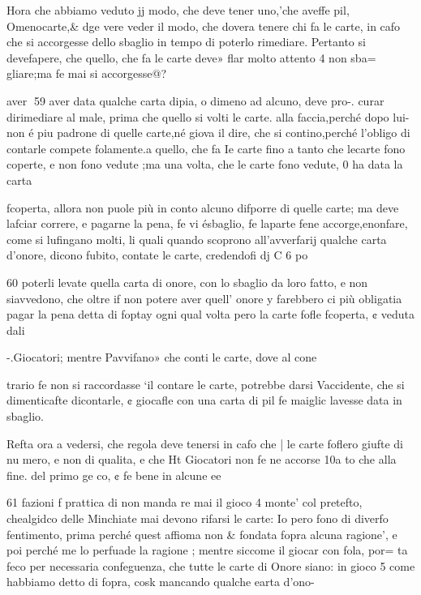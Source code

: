 \documentclass[12pt,a6paper]{article}
\begin{document}
Hora che abbiamo veduto jj
modo, che deve tener uno,'che
aveffe pil, Omenocarte,& dge
vere veder il modo, che dovera tenere chi fa le carte, in cafo
che si accorgesse dello sbaglio
in tempo di poterlo rimediare.
Pertanto si devefapere, che
quello, che fa le carte deve»
flar molto attento 4 non sba=
gliare;ma fe mai si accorgesse@?

aver
59
aver data qualche carta dipia,
o dimeno ad alcuno, deve pro-.
curar dirimediare al male, prima che quello si volti le carte.
alla faccia,perché dopo lui-non
é piu padrone di quelle carte,né
giova il dire, che si contino,perché l’obligo di contarle compete folamente.a quello, che fa Ie
carte fino a tanto che lecarte
fono coperte, e non fono vedute ;ma una volta, che le carte
fono vedute, 0 ha data la carta

fcoperta, allora non puole più 
in conto alcuno difporre di
quelle carte; ma deve lafciar
correre, e pagarne la pena, fe vi
ésbaglio, fe laparte fene accorge,enonfare, come si lufingano molti, li quali quando
scoprono all’avverfarij qualche
carta d’onore, dicono fubito,
contate le carte, credendofi dj
C 6 po 

 

 

  

60
poterli levate quella carta di
onore, con lo sbaglio da loro
fatto, e non siavvedono, che
oltre if non potere aver quell’
onore y farebbero ci più obligatia pagar la pena detta di foptay
ogni qual volta pero la carte
fofle fcoperta, ¢ veduta dali

-.Giocatori; mentre Pavvifano»
che conti le carte, dove al cone

trario fe non si raccordasse ‘il
contare le carte, potrebbe darsi
Vaccidente, che si dimenticafte
dicontarle, ¢ giocafle con una
carta di pil fe maiglic lavesse
data in sbaglio.

Refta ora a vedersi, che regola deve tenersi in cafo che |
le carte foflero giufte di nu
mero, e non di qualita, e che Ht
Giocatori non fe ne accorse 10a
to che alla fine. del primo ge
co, ¢ fe bene in alcune ee
 

61
fazioni f prattica di non manda
re mai il gioco 4 monte’ col pretefto, chealgidco delle Minchiate mai devono rifarsi le
carte: Io pero fono di diverfo
fentimento, prima perché quest
affioma non & fondata fopra alcuna ragione’, e poi perché me
lo perfuade la ragione ; mentre
siccome il giocar con fola, por=
ta feco per necessaria confeguenza, che tutte le carte di
Onore siano: in gioco 5 come
habbiamo detto di fopra, cosk
mancando qualche earta d’ono-~
\end{document}
